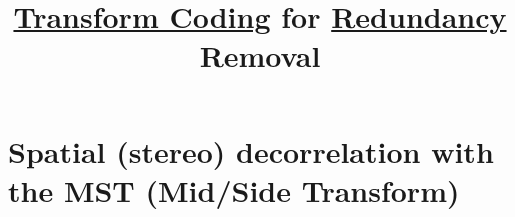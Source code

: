 
\title{\href{https://en.wikipedia.org/wiki/Transform_coding}{Transform Coding} for \href{https://en.wikipedia.org/wiki/Data_redundancy}{Redundancy} Removal}


\maketitle
\tableofcontents


\section{Spatial (stereo) decorrelation with the MST (Mid/Side Transform)}

